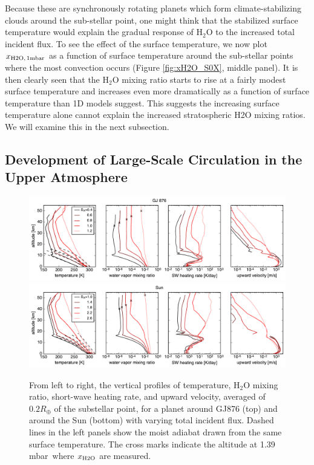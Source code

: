 \documentclass[11pt,numberedappendix,twocolappendix,]{emulateapj}
\def\water{H$_2$O }
\def\xwater{$x_{\rm H2O,\,1mbar}$ }
\def\preslevel{1.39 mbar\ }
\begin{document}
Because these are synchronously rotating planets which form climate-stabilizing clouds around the sub-stellar point, one might think that the stabilized surface temperature would explain the gradual response of \water to the increased total incident flux. 
To see the effect of the surface temperature, we now plot \xwater as a function of surface temperature around the sub-stellar points where the most convection occurs (Figure \ref{fig:xH2O_S0X}, middle panel). 
It is then clearly seen that the \water mixing ratio starts to rise at a fairly modest surface temperature and increases even more dramatically as a function of surface temperature than 1D models suggest. 
This suggests the increasing surface temperature alone cannot explain the increased stratospheric H2O mixing ratios. 
We will examine this in the next subsection. 

\subsection{Development of Large-Scale Circulation in the Upper Atmosphere}
\label{ss:result_omega}


\begin{figure}[htb]
    \begin{center}
    \includegraphics[width=1\hsize]{fig/AqOH0TLS_GJ876_temp_xH2O_vz_heat.pdf}
    \includegraphics[width=1\hsize]{fig/AqOH0TLS_Sun_temp_xH2O_vz_heat.pdf}
    \end{center}
\caption{From left to right, the vertical profiles of temperature, \water mixing ratio, short-wave heating rate, and upward velocity, averaged of $0.2R_{\oplus }$ of the substellar point, for a planet around GJ876 (top) and around the Sun (bottom) with varying total incident flux. Dashed lines in the left panels show the moist adiabat drawn from the same surface temperature. The cross marks indicate the altitude at \preslevel where  $x_{\rm H2O}$ are measured. }
\label{fig:AqOH0TLS_GJ876_temp_xH2O_vz_heat}
\end{figure}
\end{document}

